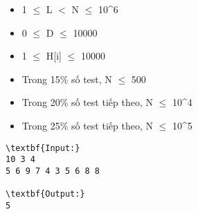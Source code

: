 \begin{itemize}
	\item 1  $\le$  L $<$ N  $\le$  10^6
	\item 0  $\le$  D  $\le$  10000
	\item 1  $\le$  H[i]  $\le$  10000
	\item Trong 15\% số test, N  $\le$  500
	\item Trong 20\% số test tiếp theo, N  $\le$  10^4
	\item Trong 25\% số test tiếp theo, N  $\le$  10^5
\end{itemize}
\begin{verbatim}
\textbf{Input:}
10 3 4
5 6 9 7 4 3 5 6 8 8

\textbf{Output:}
5\end{verbatim}